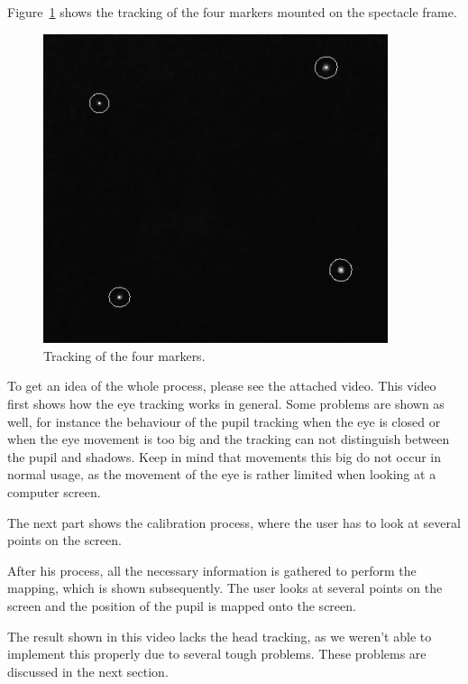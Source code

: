Figure~\ref{fig:headmarkers} shows the tracking of the four markers mounted on the spectacle frame.

\begin{figure}[h]
  \centering
  \includegraphics[width=0.9\textwidth]{fin_head.png}
  \caption{Tracking of the four markers.}\label{fig:headmarkers}
\end{figure}

To get an idea of the whole process, please see the attached video. This video first shows how the eye tracking works in general. Some problems are shown as well, for instance the behaviour of the pupil tracking when the eye is closed or when the eye movement is too big and the tracking can not distinguish between the pupil and shadows. Keep in mind that movements this big do not occur in normal usage, as the movement of the eye is rather limited when looking at a computer screen.

The next part shows the calibration process, where the user has to look at several points on the screen.

After his process, all the necessary information is gathered to perform the mapping, which is shown subsequently. The user looks at several points on the screen and the position of the pupil is mapped onto the screen. 

The result shown in this video lacks the head tracking, as we weren't able to implement this properly due to several tough problems. These problems are discussed in the next section.



